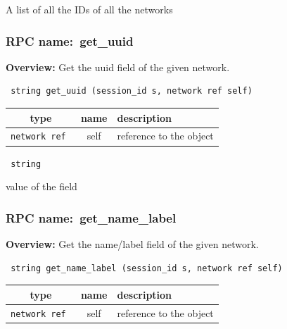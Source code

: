 A list of all the IDs of all the networks
\vspace{0.3cm}
\vspace{0.3cm}
\vspace{0.3cm}
\subsubsection{RPC name:~get\_uuid}

{\bf Overview:} 
Get the uuid field of the given network.

\begin{verbatim} string get_uuid (session_id s, network ref self)\end{verbatim}



 
\vspace{0.3cm}
\begin{tabular}{|c|c|p{7cm}|}
 \hline
{\bf type} & {\bf name} & {\bf description} \\ \hline
{\tt network ref } & self & reference to the object \\ \hline 

\end{tabular}

\vspace{0.3cm}

{\tt 
string
}


value of the field
\vspace{0.3cm}
\vspace{0.3cm}
\vspace{0.3cm}
\subsubsection{RPC name:~get\_name\_label}

{\bf Overview:} 
Get the name/label field of the given network.

\begin{verbatim} string get_name_label (session_id s, network ref self)\end{verbatim}



 
\vspace{0.3cm}
\begin{tabular}{|c|c|p{7cm}|}
 \hline
{\bf type} & {\bf name} & {\bf description} \\ \hline
{\tt network ref } & self & reference to the object \\ \hline 

\end{tabular}

